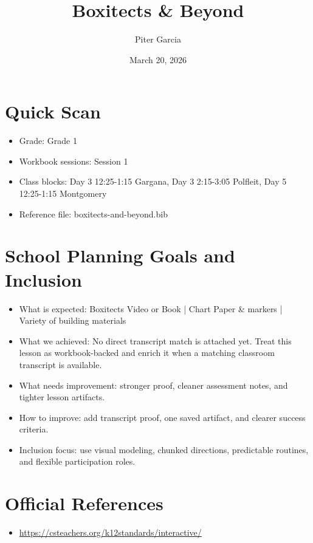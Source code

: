 \documentclass[11pt]{article}
\title{Boxitects & Beyond}
\author{Piter Garcia}
\date{March 20, 2026}
\begin{document}
\maketitle
\section*{Quick Scan}
\begin{itemize}[leftmargin=*]
\item Grade: Grade 1
\item Workbook sessions: Session 1
\item Class blocks: Day 3 12:25-1:15 Gargana, Day 3 2:15-3:05 Polfleit, Day 5 12:25-1:15 Montgomery
\item Reference file: boxitects-and-beyond.bib
\end{itemize}
\section*{School Planning Goals and Inclusion}
\begin{itemize}[leftmargin=*]
\item What is expected: Boxitects Video or Book | Chart Paper & markers | Variety of building materials
\item What we achieved: No direct transcript match is attached yet. Treat this lesson as workbook-backed and enrich it when a matching classroom transcript is available.
\item What needs improvement: stronger proof, cleaner assessment notes, and tighter lesson artifacts.
\item How to improve: add transcript proof, one saved artifact, and clearer success criteria.
\item Inclusion focus: use visual modeling, chunked directions, predictable routines, and flexible participation roles.
\end{itemize}
\section*{Official References}
\begin{itemize}[leftmargin=*]
\item \url{https://csteachers.org/k12standards/interactive/}

\end{itemize}
\end{document}
